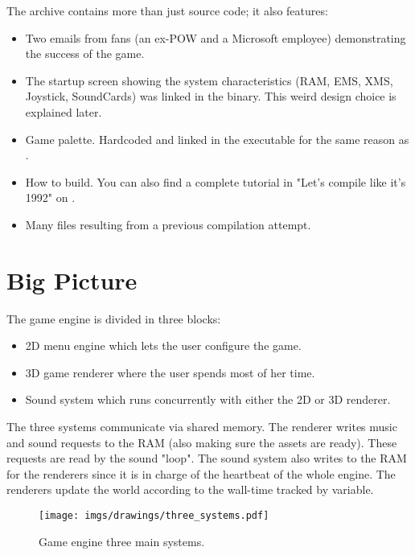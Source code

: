 \documentclass[book.tex]{subfiles}
\begin{document}
\par


 
The archive contains more than just source code; it also features:
\begin{itemize}
\item {} Two emails from fans (an ex-POW and a Microsoft employee) demonstrating the success of the game.
\item {} The startup screen showing the system characteristics (RAM, EMS, XMS, Joystick, SoundCards) was linked in the binary. This weird design choice is explained later.
\item {} Game palette. Hardcoded and linked in the executable for the same reason as .
\item {} How to build. You can also find a complete tutorial in "Let's compile like it's 1992" on .
\item Many files resulting from a previous compilation attempt.
\end{itemize}







\section{Big Picture}
The game engine is divided in three blocks:
\begin{itemize}
\item 2D menu engine which lets the user configure the game.
\item 3D game renderer where the user spends most of her time.
\item Sound system which runs concurrently with either the 2D or 3D renderer. 
\end{itemize}
The three systems communicate via shared memory. The renderer writes music and sound requests to the RAM (also making sure the assets are ready). These requests are read by the sound "loop". The sound system also writes to the RAM for the renderers since it is in charge of the heartbeat of the whole engine. The renderers update the world according to the wall-time tracked by  variable.
\par
\begin{figure}[H]
\centering
 \texttt{[image: imgs/drawings/three\_systems.pdf]}
 \caption{Game engine three main systems.}
 \end{figure}
 \par
\end{document}
